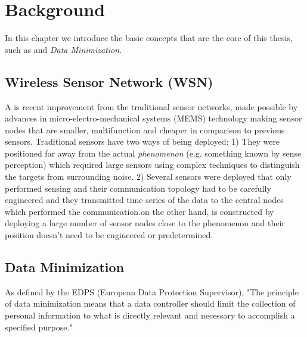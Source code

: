 \chapter{Background}

In this chapter we introduce the basic concepts that are the core of this thesis, such as \wsn and \textit{Data Minimization}. 


\section{Wireless Sensor Network (WSN)}



A \wsn is recent improvement from the traditional sensor networks, made possible by advances in micro-electro-mechanical systems (MEMS) technology making sensor nodes that are smaller, multifunction and cheaper in comparison to previous sensors. Traditional sensors have two ways of being deployed; 1) They were positioned far away from the actual \textit{phenomenon} (e.g. something known by sense perception) which required large sensors using complex techniques to distinguish the targets from surrounding noise. 2) Several sensors were deployed that only performed sensing and their communication topology had to be carefully engineered and they transmitted time series of the data to the central nodes which performed the communication.\wsns on the other hand, is constructed by deploying a large number of sensor nodes close to the phenomenon and their position doesn't need to be engineered or predetermined.\cite{WSN_a_survey} 


\section{Data Minimization}

As defined by the EDPS (European Data Protection Supervisor); "The principle of data minimization means that a data controller should limit the collection of personal information to what is directly relevant and necessary to accomplish a specified purpose." \cite{website:europa.eu} 

